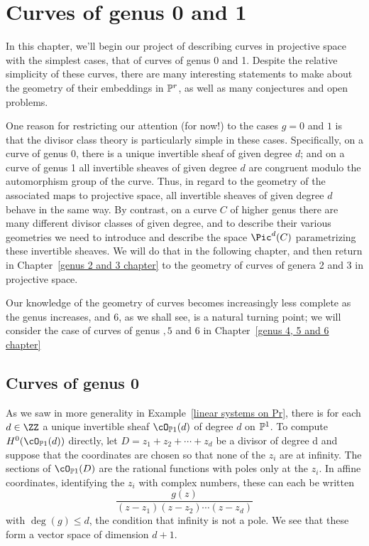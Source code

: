 

\chapter{Curves of genus 0 and 1}\label{genus 0 and 1 chapter}

In this chapter, we'll begin our project of describing curves in projective space with the simplest cases, that of curves of genus 0 and 1. Despite the relative simplicity of these curves, there are many interesting statements to make about the geometry of their embeddings in $\PP^r$, as well as many conjectures and open problems.

One reason for restricting our attention (for now!) to the cases $g=0$ and $1$ is that the divisor class theory is particularly simple in these cases. Specifically, on a curve of genus 0, there is a unique invertible sheaf of given degree $d$; and on a curve of genus 1 all invertible sheaves of given degree $d$ are congruent modulo the automorphism group of the curve. Thus, in regard to the geometry of the associated maps to projective space, all invertible sheaves of given degree $d$ behave in the same way. By contrast, on a curve $C$ of higher genus there are many different divisor classes of given degree, and to describe their various geometries we need to  introduce and describe the space $\Pic^d(C)$ parametrizing these invertible sheaves. We will do that in the following chapter, and then return in Chapter~\ref{genus 2 and 3 chapter} to the geometry of curves of genera 2 and 3 in projective space. 

Our knowledge of the geometry of curves becomes increasingly less complete as the genus increases, and 6, as we shall see, is a natural turning point; we will consider the case of curves of genus $, 5$ and $6$ in Chapter~\ref{genus 4, 5 and 6 chapter}


\section{Curves of genus 0} 


As we saw in more generality in Example~\ref{linear systems on Pr}, there is for each $d \in \ZZ$  a unique invertible sheaf $\cO_{\PP1} (d)$
of degree $d$ on $\PP^1$. To compute $H^0(\cO_{\PP1} (d))$ directly, let $D = z_1 +z_2 +\cdots+z_d$ be a divisor of degree d and suppose that the coordinates are chosen so that none of the $z_i$ are at infinity. The sections of $\cO_{\PP1} (D)$ are the rational functions with poles only at 
the $z_i$. In affine coordinates, identifying the $z_i$ with complex numbers, these can each be written
$$
\frac{g(z)}{(z-z_1)(z-z_2)\cdots(z-z_d)}
$$
with $\deg(g) \leq d$, the condition that infinity is not a pole. We see that these form a vector space of dimension $d+1$.

